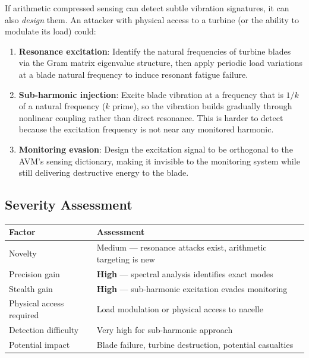 \documentclass[11pt,a4paper]{article}
\begin{document}
If arithmetic compressed sensing can detect subtle vibration
signatures, it can also \emph{design} them. An attacker with
physical access to a turbine (or the ability to modulate its load)
could:

\begin{enumerate}
  \item \textbf{Resonance excitation}: Identify the natural
    frequencies of turbine blades via the Gram matrix eigenvalue
    structure, then apply periodic load variations at a blade
    natural frequency to induce resonant fatigue failure.

  \item \textbf{Sub-harmonic injection}: Excite blade vibration at
    a frequency that is $1/k$ of a natural frequency ($k$ prime),
    so the vibration builds gradually through nonlinear coupling
    rather than direct resonance. This is harder to detect because
    the excitation frequency is not near any monitored harmonic.

  \item \textbf{Monitoring evasion}: Design the excitation signal
    to be orthogonal to the AVM's sensing dictionary, making it
    invisible to the monitoring system while still delivering
    destructive energy to the blade.
\end{enumerate}

\subsection{Severity Assessment}

\begin{center}
\begin{tabular}{@{}ll@{}}
\toprule
\textbf{Factor} & \textbf{Assessment} \\
\midrule
Novelty & Medium --- resonance attacks exist, arithmetic targeting is new \\
Precision gain & \textbf{High} --- spectral analysis identifies exact modes \\
Stealth gain & \textbf{High} --- sub-harmonic excitation evades monitoring \\
Physical access required & Load modulation or physical access to nacelle \\
Detection difficulty & Very high for sub-harmonic approach \\
Potential impact & Blade failure, turbine destruction, potential casualties \\
\bottomrule
\end{tabular}
\end{center}
\end{document}

